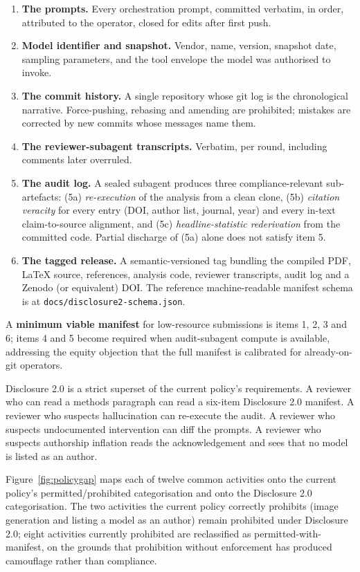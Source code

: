 \documentclass[11pt,a4paper]{article}
\begin{document}
\begin{enumerate}\setlength\itemsep{0.12em}
  \item \textbf{The prompts.} Every orchestration prompt, committed verbatim, in order, attributed to the operator, closed for edits after first push.
  \item \textbf{Model identifier and snapshot.} Vendor, name, version, snapshot date, sampling parameters, and the tool envelope the model was authorised to invoke.
  \item \textbf{The commit history.} A single repository whose git log is the chronological narrative. Force-pushing, rebasing and amending are prohibited; mistakes are corrected by new commits whose messages name them.
  \item \textbf{The reviewer-subagent transcripts.} Verbatim, per round, including comments later overruled.
  \item \textbf{The audit log.} A sealed subagent produces three compliance-relevant sub-artefacts: (5a) \emph{re-execution} of the analysis from a clean clone, (5b) \emph{citation veracity} for every entry (DOI, author list, journal, year) and every in-text claim-to-source alignment, and (5c) \emph{headline-statistic rederivation} from the committed code. Partial discharge of (5a) alone does not satisfy item 5.
  \item \textbf{The tagged release.} A semantic-versioned tag bundling the compiled PDF, LaTeX source, references, analysis code, reviewer transcripts, audit log and a Zenodo (or equivalent) DOI. The reference machine-readable manifest schema is at \texttt{docs/disclosure2-schema.json}.
\end{enumerate}

A \textbf{minimum viable manifest} for low-resource submissions is items 1, 2, 3 and 6; items 4 and 5 become required when audit-subagent compute is available, addressing the equity objection that the full manifest is calibrated for already-on-git operators.

Disclosure 2.0 is a strict superset of the current policy's requirements. A reviewer who can read a methods paragraph can read a six-item Disclosure 2.0 manifest. A reviewer who suspects hallucination can re-execute the audit. A reviewer who suspects undocumented intervention can diff the prompts. A reviewer who suspects authorship inflation reads the acknowledgement and sees that no model is listed as an author.

Figure~\ref{fig:policygap} maps each of twelve common activities onto the current policy's permitted/prohibited categorisation and onto the Disclosure 2.0 categorisation. The two activities the current policy correctly prohibits (image generation and listing a model as an author) remain prohibited under Disclosure 2.0; eight activities currently prohibited are reclassified as permitted-with-manifest, on the grounds that prohibition without enforcement has produced camouflage rather than compliance.
\end{document}
